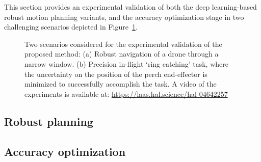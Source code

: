 This section provides an experimental validation of both the deep learning-based robust motion planning variants, and the accuracy optimization stage in two challenging scenarios depicted in Figure~\ref{fig: Missed and succes}.

\begin{figure} [h]
    \centering
    \caption{
    Two scenarios considered for the experimental validation of the proposed method:
    (a) Robust navigation of a drone through a narrow window. (b) Precision in-flight `ring catching' task, where the uncertainty on the position of the perch end-effector is minimized to successfully accomplish the task.
    A video of the experiments is available at: \href{https://laas.hal.science/hal-04642257}{https://laas.hal.science/hal-04642257}}%
    \label{fig: Missed and succes}%
\end{figure}

\subsection{Robust planning} \label{sec:RobustPlanExp}

\subsection{Accuracy optimization} \label{sec:AccOptExp}

